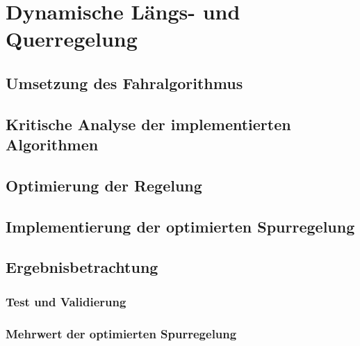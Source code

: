 \chapter{Dynamische Längs- und Querregelung} \label{cha:DynamischeRegelung}
\lipsum[1-1]

\section{Umsetzung des Fahralgorithmus} \label{sec:UmsetzungFahralgorithmus} %

\section{Kritische Analyse der implementierten Algorithmen} \label{sec:KritischeAnalyseAlgorithmen} %

\section{Optimierung der Regelung} \label{sec:OptimierungRegelung}

\section{Implementierung der optimierten Spurregelung} \label{sec:ImplementierungRegeleung}

\section{Ergebnisbetrachtung} \label{sec:ErgebnisRegelung}
\subsection{Test und Validierung} \label{subsec:TestValidierungRegelung}
\subsection{Mehrwert der optimierten Spurregelung} \label{subsec:MehrwertRegelung}